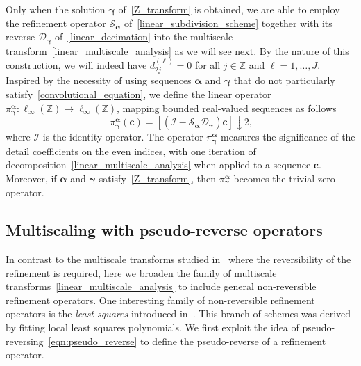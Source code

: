 \documentclass[12pt]{article}
\begin{document}
Only when the solution $\boldsymbol{\gamma}$ of~\eqref{Z_transform} is obtained, we are able to employ the refinement operator $\mathcal{S}_{\boldsymbol{\alpha}}$ of~\eqref{linear_subdivision_scheme} together with its reverse $\mathcal{D}_{\boldsymbol{\gamma}}$ of~\eqref{linear_decimation} into the multiscale transform~\eqref{linear_multiscale_analysis} as we will see next. By the nature of this construction, we will indeed have $d^{(\ell)}_{2j}=0$ for all $j\in\mathbb{Z}$ and $\ell=1,\dots,J$. Inspired by the necessity of using sequences $\boldsymbol{\alpha}$ and $\boldsymbol{\gamma}$ that do not particularly satisfy~\eqref{convolutional_equation}, we define the linear operator $\pi^{\boldsymbol{\alpha}}_{\boldsymbol{\gamma}}:\ell_{\infty}(\mathbb{Z})\rightarrow\ell_{\infty}(\mathbb{Z})$, mapping bounded real-valued sequences as follows
\begin{equation}~\label{eqn:even_details}
    \pi^{\boldsymbol{\alpha}}_{\boldsymbol{\gamma}}(\boldsymbol{c}) = [(\mathcal{I}-\mathcal{S}_{\boldsymbol{\alpha}} \mathcal{D}_{\boldsymbol{\gamma}})\boldsymbol{c}]\downarrow 2,
\end{equation}
where $\mathcal{I}$ is the identity operator. The operator $\pi^{\boldsymbol{\alpha}}_{\boldsymbol{\gamma}}$ measures the significance of the detail coefficients on the even indices, with one iteration of decomposition~\eqref{linear_multiscale_analysis} when applied to a sequence $\boldsymbol{c}$. Moreover, if $\boldsymbol{\alpha}$ and $\boldsymbol{\gamma}$ satisfy~\eqref{Z_transform}, then $\pi^{\boldsymbol{\alpha}}_{\boldsymbol{\gamma}}$ becomes the trivial zero operator.

\subsection{Multiscaling with pseudo-reverse operators}

In contrast to the multiscale transforms studied in~\cite{mattar2023pyramid, dyn2021linear} where the reversibility of the refinement is required, here we broaden the family of multiscale transforms~\eqref{linear_multiscale_analysis} to include general non-reversible refinement operators. One interesting family of non-reversible refinement operators is the \emph{least squares} introduced in~\cite{dyn2015univariate}. This branch of schemes was derived by fitting local least squares polynomials. We first exploit the idea of pseudo-reversing~\eqref{eqn:pseudo_reverse} to define the pseudo-reverse of a refinement operator.
\end{document}
